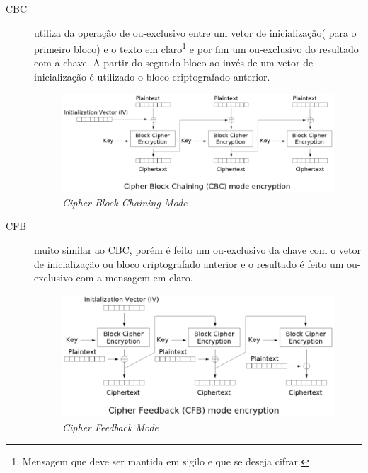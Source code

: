 \begin{description}
\begin{figure}[h]
\end{figure} 
\item[CBC] utiliza da operação de ou-exclusivo entre um vetor de inicialização( para o primeiro bloco) e o texto em claro\footnote{Mensagem que deve ser mantida em sigilo e que se deseja cifrar.} e por fim um ou-exclusivo do resultado com a chave. A partir do segundo bloco ao invés de um vetor de inicialização é utilizado o bloco criptografado anterior.
\begin{figure}[h]
\centering
\includegraphics[keepaspectratio=true,scale=0.7]
    {figuras/cbc.eps}
    \caption[\textit{Cipher Block Chaining Mode}]{\textit{Cipher Block Chaining Mode}\protect\footnotemark}
\end{figure} 
\item[CFB] muito similar ao CBC, porém é feito um ou-exclusivo da chave com o vetor de inicialização ou bloco criptografado anterior e o resultado é feito um ou-exclusivo com a mensagem em claro.
\begin{figure}[h]
\centering
\includegraphics[keepaspectratio=true,scale=0.7]
    {figuras/cfb.eps}
    \caption[\textit{Cipher Feedback Mode }]{\textit{Cipher Feedback Mode } \protect\footnotemark} 
\end{figure}

\end{description}
